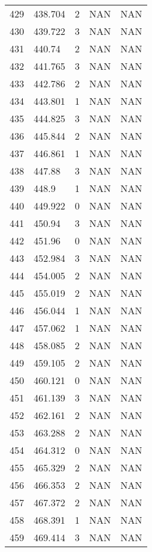 \documentclass{article}
\begin{document}
\begin{longtable}{@{}lllll@{}}
					429 & 438.704 & 2     & NAN   & NAN   \\
					430 & 439.722 & 3     & NAN   & NAN   \\
					431 & 440.74  & 2     & NAN   & NAN   \\
					432 & 441.765 & 3     & NAN   & NAN   \\
					433 & 442.786 & 2     & NAN   & NAN   \\
					434 & 443.801 & 1     & NAN   & NAN   \\
					435 & 444.825 & 3     & NAN   & NAN   \\
					436 & 445.844 & 2     & NAN   & NAN   \\
					437 & 446.861 & 1     & NAN   & NAN   \\
					438 & 447.88  & 3     & NAN   & NAN   \\
					439 & 448.9   & 1     & NAN   & NAN   \\
					440 & 449.922 & 0     & NAN   & NAN   \\
					441 & 450.94  & 3     & NAN   & NAN   \\
					442 & 451.96  & 0     & NAN   & NAN   \\
					443 & 452.984 & 3     & NAN   & NAN   \\
					444 & 454.005 & 2     & NAN   & NAN   \\
					445 & 455.019 & 2     & NAN   & NAN   \\
					446 & 456.044 & 1     & NAN   & NAN   \\
					447 & 457.062 & 1     & NAN   & NAN   \\
					448 & 458.085 & 2     & NAN   & NAN   \\
					449 & 459.105 & 2     & NAN   & NAN   \\
					450 & 460.121 & 0     & NAN   & NAN   \\
					451 & 461.139 & 3     & NAN   & NAN   \\
					452 & 462.161 & 2     & NAN   & NAN   \\
					453 & 463.288 & 2     & NAN   & NAN   \\
					454 & 464.312 & 0     & NAN   & NAN   \\
					455 & 465.329 & 2     & NAN   & NAN   \\
					456 & 466.353 & 2     & NAN   & NAN   \\
					457 & 467.372 & 2     & NAN   & NAN   \\
					458 & 468.391 & 1     & NAN   & NAN   \\
					459 & 469.414 & 3     & NAN   & NAN   \\

\end{longtable}
\end{document}

